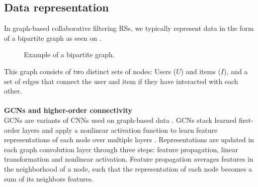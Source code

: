 \subsection{Data representation}
In graph-based collaborative filtering RSs, we typically represent data in the form of a bipartite graph as seen on .
\begin{figure}[h]
\caption{Example of a bipartite graph.}
\label{fig:bipartite-graph}
\end{figure}
This graph consists of two distinct sets of nodes: Users ($U$) and items ($I$), and a set of edges that connect the user and item if they have interacted with each other.\\\\
\textbf{GCNs and higher-order connectivity}
\\
GCNs are variants of CNNs used on graph-based data \cite{KOrderConnectivity}.
GCNs stack learned first-order layers and apply a nonlinear activation function to learn feature representations of each node over multiple layers \cite{KOrderConnectivity}.
Representations are updated in each graph convolution layer through three steps: feature propagation, linear transformation and nonlinear activation.
Feature propagation averages features in the neighborhood of a node, such that the representation of each node becomes a sum of its neighbors features.
